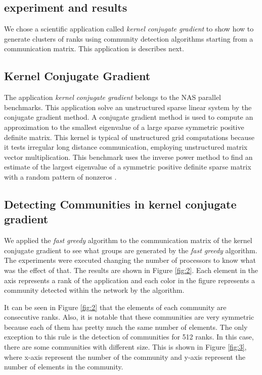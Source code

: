 \documentclass[journal]{IEEEtran}
\begin{document}
\begin{NoHyper}
\section{experiment and results}

We chose a scientific application called \textit{kernel conjugate gradient} to show how to generate clusters of ranks using community detection algorithms starting from a communication matrix. This application is describes next.

\subsection{Kernel Conjugate Gradient}

The application \textit{kernel conjugate gradient} belongs to the NAS parallel benchmarks. This application solve an unstructured sparse linear system by the conjugate gradient method. A conjugate gradient method is used to compute an approximation to the smallest eigenvalue of a large sparse symmetric positive definite matrix. This kernel is typical of unstructured grid computations because it tests irregular long distance communication, employing unstructured matrix vector multiplication. This benchmark uses the inverse power method to find an estimate of the largest eigenvalue of a symmetric positive definite sparse matrix with a random pattern of nonzeros \cite{cg}.

\subsection{Detecting Communities in kernel conjugate gradient}

We applied the \textit{fast greedy} algorithm to the communication matrix of the kernel conjugate gradient to see what groups are generated by the \textit{fast greedy} algorithm. The experiments were executed changing the number of processors to know what was the effect of that. The results are shown in Figure \ref{fig:2}. Each element in the axis represents a rank of the application and each color in the figure represents a community detected within the network by the algorithm. 

It can be seen in Figure \ref{fig:2} that the elements of each community are consecutive ranks. Also, it is notable that these communities are very symmetric because each of them has pretty much the same number of elements. The only exception to this rule is the detection of communities for 512 ranks. In this case, there are some communities with different size. This is shown in Figure \ref{fig:3}, where x-axis represent the number of the community and y-axis represent the number of elements in the community. 


\end{NoHyper}
\end{document}
